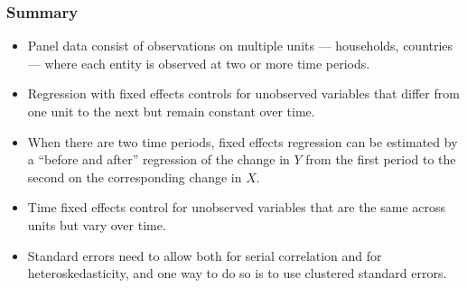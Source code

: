 

\begin{frame}
\frametitle{Summary}
\begin{itemize}
\item Panel data consist of observations on multiple units --- households, countries --- where each entity is observed at two or more time periods.
\item Regression with fixed effects controls for unobserved variables that differ from one unit to the next but remain constant over time.
\item When there are two time periods, fixed effects regression can be estimated by a ``before and after'' regression of the change in $Y$ from the first period to the second on the corresponding change in $X$.
\item Time fixed effects control for unobserved variables that are the same across units but vary over time.
\item Standard errors need to allow both for serial correlation and for heteroskedasticity, and one way to do so is to use clustered standard errors.
\end{itemize}
\end{frame}


